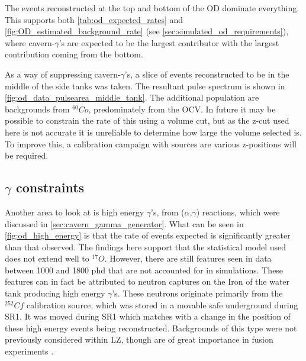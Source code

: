 \par
The events reconstructed at the top and bottom of the OD dominate everything.
This supports both \autoref{tab:od_expected_rates} and \autoref{fig:OD_estimated_background_rate} (see \autoref{sec:simulated_od_requirements}), where cavern-$\gamma$'s are expected to be the largest contributor with the largest contribution coming from the bottom. 

\par
As a way of suppressing cavern-$\gamma$'s, a slice of events reconstructed to be in the middle of the side tanks was taken.
The resultant pulse spectrum is shown in  \autoref{fig:od_data_pulsearea_middle_tank}.
The additional population are backgrounds from ${}^{60}Co$, predominately from the OCV.
In future it may be possible to constrain the rate of this using a volume cut, but as the z-cut used here is not accurate it is unreliable to determine how large the volume selected is.
To improve this, a calibration campaign with sources are various z-positions will be required.






\subsection{$\gamma$ constraints}
\par
Another area to look at is high energy $\gamma$'s, from ($\alpha$,$\gamma$) reactions, which were discussed in \autoref{sec:cavern_gamma_generator}.
What can be seen in \autoref{fig:od_high_energy} is that the rate of events expected is significantly greater than that observed.
The findings here support that the statistical model used does not extend well to ${}^{17}O$.
However, there are still features seen in data between 1000 and 1800 phd that are not accounted for in simulations.
These features can in fact be attributed to neutron captures on the Iron of the water tank producing high energy $\gamma$'s.
These neutrons originate primarily from the ${}^{252}Cf$ calibration source, which was stored in a movable safe underground during SR1.
It was moved during SR1 which matches with a change in the position of these high energy events being reconstructed.
Backgrounds of this type were not previously considered within LZ, though are of great importance in fusion experiments \cite{iter_neutrons_ref}.



